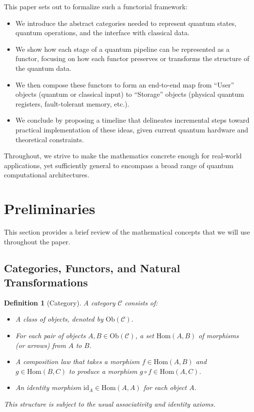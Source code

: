 \documentclass[12pt]{article}
\newtheorem{definition}[theorem]{Definition}
\begin{document}
This paper sets out to formalize such a functorial framework:

\begin{itemize}
\item We introduce the abstract categories needed to represent quantum states, quantum operations, and the interface with classical data.
\item We show how each stage of a quantum pipeline can be represented as a functor, focusing on how each functor preserves or transforms the structure of the quantum data.
\item We then compose these functors to form an end-to-end map from ``User'' objects (quantum or classical input) to ``Storage'' objects (physical quantum registers, fault-tolerant memory, etc.).
\item We conclude by proposing a timeline that delineates incremental steps toward practical implementation of these ideas, given current quantum hardware and theoretical constraints.
\end{itemize}

Throughout, we strive to make the mathematics concrete enough for real-world applications, yet sufficiently general to encompass a broad range of quantum computational architectures.

\section{Preliminaries}

This section provides a brief review of the mathematical concepts that we will use throughout the paper.

\subsection{Categories, Functors, and Natural Transformations}

\begin{definition}[Category]
A \emph{category} $\mathcal{C}$ consists of:
\begin{itemize}
\item A class of \emph{objects}, denoted by $\mathrm{Ob}(\mathcal{C})$.
\item For each pair of objects $A, B \in \mathrm{Ob}(\mathcal{C})$, a set $\mathrm{Hom}(A,B)$ of \emph{morphisms} (or \emph{arrows}) from $A$ to $B$.
\item A composition law that takes a morphism $f \in \mathrm{Hom}(A,B)$ and $g \in \mathrm{Hom}(B,C)$ to produce a morphism $g \circ f \in \mathrm{Hom}(A,C)$.
\item An identity morphism $\mathrm{id}_A \in \mathrm{Hom}(A,A)$ for each object $A$.
\end{itemize}
This structure is subject to the usual associativity and identity axioms.
\end{definition}
\end{document}
